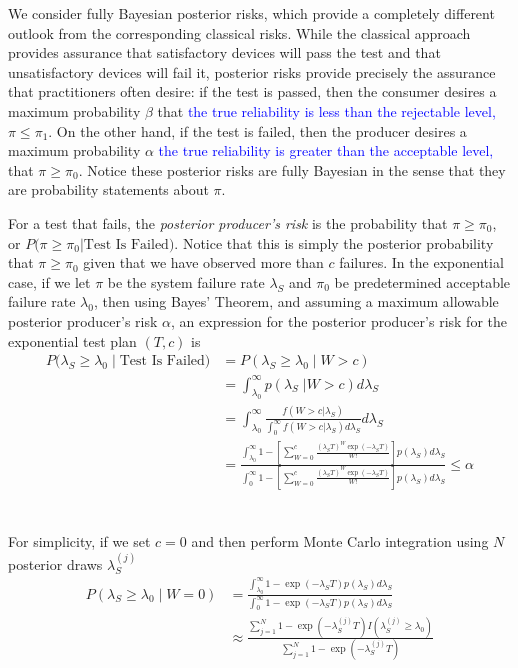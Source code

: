 \documentclass[12pt]{article}
\begin{document}
We consider fully Bayesian posterior risks, which provide a completely
different outlook from the corresponding classical risks.  While the classical approach
provides assurance that satisfactory devices will pass the test and that
unsatisfactory devices will fail it, posterior risks provide precisely the
assurance that practitioners often desire: if the test is passed, then the
consumer desires a maximum probability $\beta$ that \textcolor{blue}{the true reliability is less than the rejectable level,} $\pi \leq \pi_1$. On the
other hand, if the test is failed, then the producer desires a maximum
probability $\alpha$ \textcolor{blue}{the true reliability is greater than the acceptable level,} that $\pi \geq \pi_0$. Notice these posterior risks are fully Bayesian in the sense that they are probability statements about $\pi$.

For a test that fails, the \emph{posterior producer's risk} is the probability
that $\pi \geq \pi_{0}$, or $P \text{(}\pi \ge \pi_0 \vert \text{Test Is
Failed)}$. Notice that this is simply the posterior probability that $\pi \ge
\pi_0$ given that we have observed more than $c$ failures. In the exponential
case, if we let $\pi$ be the system failure rate $\lambda_S$ and $\pi_0$ be
predetermined acceptable failure rate $\lambda_0$, then using Bayes' Theorem,
and assuming a maximum allowable posterior producer's risk $\alpha$, an
expression for the posterior producer's risk for the exponential test plan
$(T,c)$ is
$$
\begin{aligned}
    P(\lambda_S \geq \lambda_0 \; \vert \; \text{Test Is Failed)} &= P(\lambda_S
    \geq \lambda_0 \; \vert \; W > c) \\ &= \int_{\lambda_0}^{\infty}
    p(\lambda_S \; \vert W > c) d\lambda_S \\ &= \int_{\lambda_0}^{\infty}
    \frac{f(W > c \vert \lambda_S)}{\int_{0}^{\infty} f(W > c \vert \lambda_S)
    d\lambda_S} d\lambda_S \\ &= \frac{\int_{\lambda_0}^{\infty} 1 - [ \sum_{W=0}^c
    \frac{(\lambda_S T)^W \exp(-\lambda_S T)}{W!}]p(\lambda_S)d\lambda_S}
    {\int_{0}^{\infty} 1 - [ \sum_{W=0}^c \frac{(\lambda_S T)^W \exp(-\lambda_S
    T)}{W!}]p(\lambda_S)d\lambda_S} \leq \alpha
\end{aligned}
$$
\\
\\
For simplicity, if we set $c = 0$ and then perform Monte Carlo integration
using $N$ posterior draws $ \lambda_S^{(j)} $
$$
\begin{aligned}
	 P(\lambda_S \geq \lambda_0 \; \vert \; W = 0) &=
	 \frac{\int_{\lambda_0}^{\infty} 1 - \exp(-\lambda_S T)p(\lambda_S)d\lambda_S}
	 {\int_{0}^{\infty} 1 - \exp(-\lambda_S T)p(\lambda_S)d\lambda_S} \\ &\approx
	 \frac{\sum_{j = 1}^{N} 1 - \exp(-\lambda_S^{(j)} T)I(\lambda_S^{(j)} \geq
	 \lambda_0)} {\sum_{j = 1}^{N} 1 - \exp(-\lambda_S^{(j)} T)} \end{aligned}
$$
\end{document}
